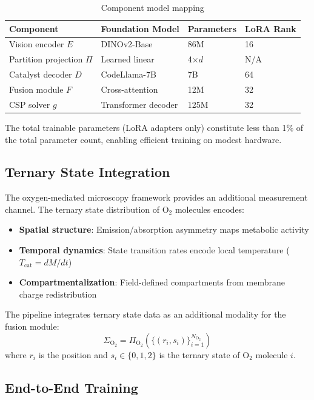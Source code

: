 \documentclass[11pt,twocolumn,a4paper]{article}
\theoremstyle{definition}
\theoremstyle{remark}
\newcommand{\Sig}{\Sigma}
\begin{document}
\begin{table}[H]
\centering
\caption{Component model mapping}
\label{tab:models}
\begin{tabular}{@{}llll@{}}
\toprule
Component & Foundation Model & Parameters & LoRA Rank \\
\midrule
Vision encoder $E$ & DINOv2-Base & 86M & 16 \\
Partition projection $\Pi$ & Learned linear & 4$\times d$ & N/A \\
Catalyst decoder $D$ & CodeLlama-7B & 7B & 64 \\
Fusion module $F$ & Cross-attention & 12M & 32 \\
CSP solver $g$ & Transformer decoder & 125M & 32 \\
\bottomrule
\end{tabular}
\end{table}

The total trainable parameters (LoRA adapters only) constitute less than 1\% of the total parameter count, enabling efficient training on modest hardware.

\subsection{Ternary State Integration}

The oxygen-mediated microscopy framework provides an additional measurement channel. The ternary state distribution of O$_2$ molecules encodes:
\begin{itemize}
    \item \textbf{Spatial structure}: Emission/absorption asymmetry maps metabolic activity
    \item \textbf{Temporal dynamics}: State transition rates encode local temperature ($T_{\text{cat}} = dM/dt$)
    \item \textbf{Compartmentalization}: Field-defined compartments from membrane charge redistribution
\end{itemize}

The pipeline integrates ternary state data as an additional modality for the fusion module:
\begin{equation}
\Sig_{\text{O}_2} = \Pi_{\text{O}_2}(\{(r_i, s_i)\}_{i=1}^{N_{\text{O}_2}})
\end{equation}
where $r_i$ is the position and $s_i \in \{0, 1, 2\}$ is the ternary state of O$_2$ molecule $i$.

\subsection{End-to-End Training}
\end{document}
